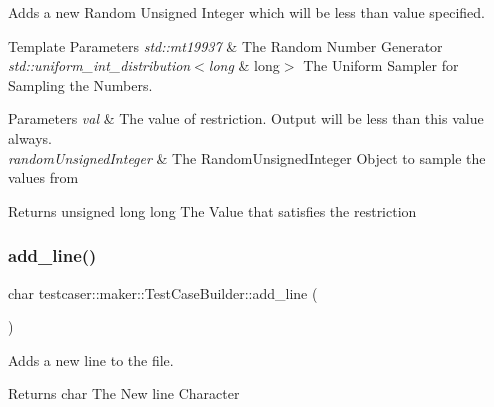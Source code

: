Adds a new Random Unsigned Integer which will be less than value specified. 


\begin{DoxyTemplParams}{Template Parameters}
{\em std\+::mt19937} & The Random Number Generator \\
\hline
{\em std\+::uniform\+\_\+int\+\_\+distribution$<$long} & long$>$ The Uniform Sampler for Sampling the Numbers. \\
\hline
\end{DoxyTemplParams}

\begin{DoxyParams}{Parameters}
{\em val} & The value of restriction. Output will be less than this value always. \\
\hline
{\em random\+Unsigned\+Integer} & The Random\+Unsigned\+Integer Object to sample the values from \\
\hline
\end{DoxyParams}
\begin{DoxyReturn}{Returns}
unsigned long long The Value that satisfies the restriction 
\end{DoxyReturn}
\mbox{\label{classtestcaser_1_1maker_1_1TestCaseBuilder_abdb7ac9e7f1036c4b84adf48bb019cfa}} 
\subsubsection{\texorpdfstring{add\+\_\+line()}{add\_line()}}
{\footnotesize\ttfamily char testcaser\+::maker\+::\+Test\+Case\+Builder\+::add\+\_\+line (\begin{DoxyParamCaption}{ }\end{DoxyParamCaption})\hspace{0.3cm}{\ttfamily [inline]}}



Adds a new line to the file. 

\begin{DoxyReturn}{Returns}
char The New line Character 
\end{DoxyReturn}
\mbox{\label{classtestcaser_1_1maker_1_1TestCaseBuilder_ac6cfa5b3269b899b19fc5b4d2e97b4aa}} 
